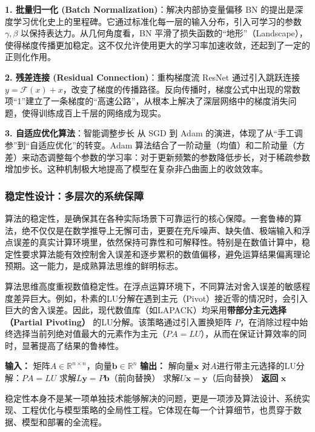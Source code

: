 \textbf{1. 批量归一化 (Batch Normalization)}：解决内部协变量偏移
BN 的提出是深度学习优化史上的里程碑。它通过标准化每一层的输入分布，引入可学习的参数 $\gamma, \beta$ 以保持表达力。从几何角度看，BN 平滑了损失函数的“地形”（Landscape），使得梯度传播更加稳定。这不仅允许使用更大的学习率加速收敛，还起到了一定的正则化作用。

\textbf{2. 残差连接 (Residual Connection)}：重构梯度流
ResNet 通过引入跳跃连接 $y = \mathcal{F}(x) + x$，改变了梯度的传播路径。反向传播时，梯度公式中出现的常数项“1”建立了一条梯度的“高速公路”，从根本上解决了深层网络中的梯度消失问题，使得训练成百上千层的网络成为现实。

\textbf{3. 自适应优化算法}：智能调整步长
从 SGD 到 Adam 的演进，体现了从“手工调参”到“自适应优化”的转变。Adam 算法结合了一阶动量（均值）和二阶动量（方差）来动态调整每个参数的学习率：对于更新频繁的参数降低步长，对于稀疏参数增加步长。这种机制极大地提高了模型在复杂非凸曲面上的收敛效率。

\subsubsection{稳定性设计：多层次的系统保障}

算法的稳定性，是确保其在各种实际场景下可靠运行的核心保障。一套鲁棒的算法，绝不仅仅是在数学推导上无懈可击，更要在充斥噪声、缺失值、极端输入和浮点误差的真实计算环境里，依然保持可靠性和可解释性。特别是在数值计算中，稳定性要求算法能有效控制舍入误差和逐步累积的数值偏移，避免运算结果偏离理论预期。这一能力，是成熟算法思维的鲜明标志。

算法思维高度重视数值稳定性。在浮点运算环境下，不同算法对舍入误差的敏感程度差异巨大。例如，朴素的LU分解在遇到主元（Pivot）接近零的情况时，会引入巨大的舍入误差。因此，现代数值库（如LAPACK）均采用\textbf{带部分主元选择（Partial Pivoting）} 的LU分解。该策略通过引入置换矩阵 $P$，在消除过程中始终选择当前列绝对值最大的元素作为主元（$PA=LU$），从而在保证计算效率的同时，显著提高了结果的鲁棒性。

\begin{algorithmic}[1]
\STATE \textbf{输入：} 矩阵$A \in \mathbb{R}^{n \times n}$，向量$\mathbf{b} \in \mathbb{R}^n$
\STATE \textbf{输出：} 解向量$\mathbf{x}$
\STATE 对$A$进行带主元选择的LU分解：$PA = LU$
\STATE 求解$L\mathbf{y} = P\mathbf{b}$（前向替换）
\STATE 求解$U\mathbf{x} = \mathbf{y}$（后向替换）
\STATE \textbf{返回} $\mathbf{x}$
\end{algorithmic}

稳定性本身不是某一项单独技术能够解决的问题，更是一项涉及算法设计、系统实现、工程优化与模型策略的全局性工程。它体现在每一个计算细节，也贯穿于数据、模型和部署的全流程。


